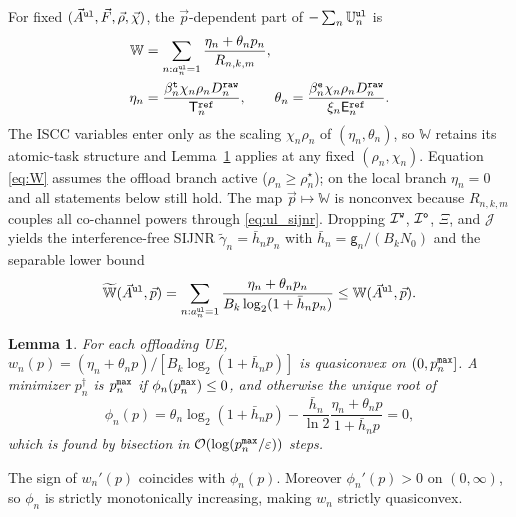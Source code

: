 \documentclass[journal]{IEEEtran}
\newtheorem{lemma}{Lemma}
\begin{document}
For fixed $(\vec{A}^{\tt ul},\vec{F},\vec{\rho},\vec{\chi})$, the $\vec{p}$-dependent part of $-\sum_n\mathbb{U}_n^{\tt ul}$ is
\begin{align}
\mathbb{W}
&=\sum_{n:a_n^{\tt ul}=1}
\frac{\eta_n+\theta_n p_n}{R_{n,k,m}},
\label{eq:W}\\
\eta_n&=\frac{\beta_n^{\tt t}\chi_n\rho_n D_n^{\tt raw}}{\mathsf{T}_n^{\tt ref}},
\qquad
\theta_n=\frac{\beta_n^{\tt e}\chi_n\rho_n D_n^{\tt raw}}{\xi_n\mathsf{E}_n^{\tt ref}}.
\nonumber
\end{align}
The ISCC variables enter only as the scaling $\chi_n\rho_n$ of $(\eta_n,\theta_n)$, so $\mathbb{W}$ retains its atomic-task structure and Lemma~\ref{lem:quasi} applies at any fixed $(\rho_n,\chi_n)$. Equation \eqref{eq:W} assumes the offload branch active ($\rho_n\ge\rho_n^\star$); on the local branch $\eta_n=0$ and all statements below still hold.
The map $\vec{p}\mapsto\mathbb{W}$ is nonconvex because $R_{n,k,m}$ couples all co-channel powers through \eqref{eq:ul_sijnr}. Dropping $\mathcal{I}^{\tt w}$, $\mathcal{I}^{\tt o}$, $\Xi$, and $\mathcal{J}$ yields the interference-free SIJNR $\tilde\gamma_{n}= \bar h_n p_n$ with $\bar h_n=\mathsf{g}_n/(B_k N_0)$ and the separable lower bound
\begin{equation}
\widetilde{\mathbb{W}}(\vec{A}^{\tt ul},\vec{p})
=\sum_{n:a_n^{\tt ul}=1}
\frac{\eta_n+\theta_n p_n}{B_k\log_2(1+\bar h_n p_n)}
\le \mathbb{W}(\vec{A}^{\tt ul},\vec{p}).
\label{eq:Wtil}
\end{equation}

\begin{lemma}\label{lem:quasi}
For each offloading UE, $w_n(p)=(\eta_n+\theta_n p)/[B_k\log_2(1+\bar h_n p)]$ is quasiconvex on $(0,p_n^{\tt max}]$. A minimizer $p_n^\dagger$ is $p_n^{\tt max}$ if $\phi_n(p_n^{\tt max})\le 0$, and otherwise the unique root of
\begin{equation}
\phi_n(p)
=\theta_n\log_2(1+\bar h_n p)
-\frac{\bar h_n}{\ln 2}\frac{\eta_n+\theta_n p}{1+\bar h_n p}=0,
\label{eq:phi}
\end{equation}
which is found by bisection in $\mathcal{O}(\log(p_n^{\tt max}/\varepsilon))$ steps.
\end{lemma}
\begin{IEEEproof}
The sign of $w_n'(p)$ coincides with $\phi_n(p)$. 
{\color{blue}Moreover $\phi_n'(p)>0$ on $(0,\infty)$, so $\phi_n$ is strictly monotonically increasing, making $w_n$ strictly quasiconvex.}
\end{IEEEproof}
\end{document}
